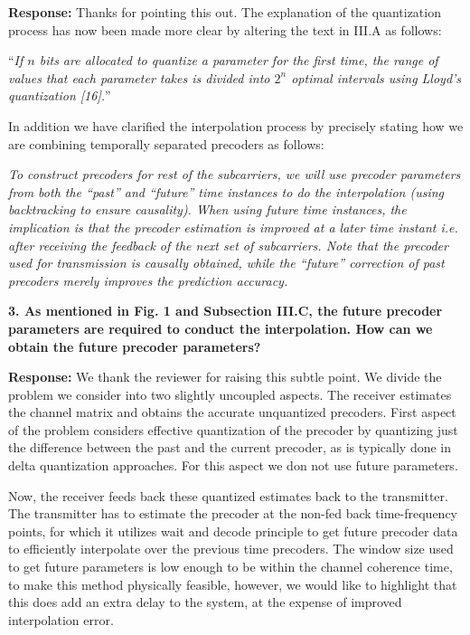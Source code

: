 \documentclass[12pt]{letter}
\begin{document}
\textbf{Response:}
Thanks for pointing this out. The explanation of the quantization
process has now been made more  clear by altering the text in III.A as
follows:

``\emph{If $n$ bits are allocated to quantize a parameter
for the first time, the range of values that each parameter takes is
divided into $2^n$ optimal intervals using Lloyd's
quantization [16].}''

In addition we have clarified the interpolation process by precisely stating
how we are combining temporally separated precoders as follows:
 
\emph{To construct precoders for rest of the subcarriers, we will use
precoder parameters from both the ``past'' and ``future'' time
instances to do the interpolation (using backtracking to ensure
causality). When using future time instances, the implication is that the precoder
estimation is improved at a later time instant i.e. after receiving
the feedback of the next set of subcarriers. Note that the precoder
used for transmission is causally obtained, while the ``future''
correction of past precoders merely improves the prediction
accuracy.}

\textbf{3. As mentioned in Fig. 1 and Subsection III.C, the future
  precoder parameters are required to conduct the interpolation. How
  can we obtain the future precoder parameters?}

\textbf{Response:} 
We thank the reviewer for raising this subtle point. We divide the problem we consider into two slightly uncoupled aspects. The receiver estimates the channel matrix and obtains the accurate unquantized precoders. First aspect of the problem considers effective quantization of the precoder by quantizing just the difference between the past and the current precoder, as is typically done in delta quantization approaches. For this aspect we don not use future parameters.

Now, the receiver feeds back these quantized estimates back to the transmitter. The transmitter has to estimate the precoder at the non-fed back time-frequency points, for which it utilizes wait and decode principle to get future precoder data to efficiently interpolate over the previous time precoders. The window size used to get future parameters is low enough to be within the channel coherence time, to make this method physically feasible, however, we would like to highlight that this does add an extra delay to the system, at the expense of improved interpolation error.
\end{document}
